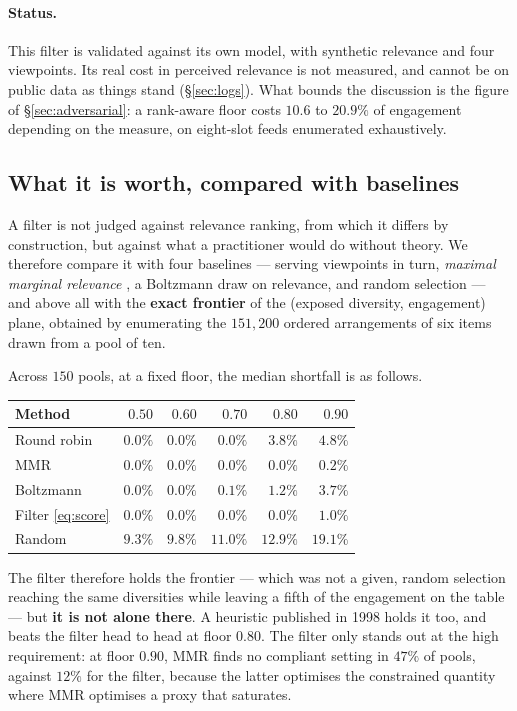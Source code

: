 \documentclass[11pt,a4paper]{article}
\begin{document}
\paragraph{Status.} This filter is validated against its own model, with synthetic relevance and
four viewpoints. Its real cost in perceived relevance is not measured, and cannot be on public
data as things stand (\S\ref{sec:logs}). What bounds the discussion is the figure of
\S\ref{sec:adversarial}: a rank-aware floor costs $10.6$ to $20.9\%$ of engagement depending on
the measure, on eight-slot feeds enumerated exhaustively.

\subsection{What it is worth, compared with baselines}
\label{sec:baselines}

A filter is not judged against relevance ranking, from which it differs by construction, but
against what a practitioner would do without theory. We therefore compare it with four baselines
--- serving viewpoints in turn, \emph{maximal marginal relevance} \citep{carbonell1998}, a
Boltzmann draw on relevance, and random selection --- and above all with the \textbf{exact
frontier} of the (exposed diversity, engagement) plane, obtained by enumerating the $151{,}200$
ordered arrangements of six items drawn from a pool of ten.

Across $150$ pools, at a fixed floor, the median shortfall is as follows.

\begin{center}
\begin{tabular}{@{}lrrrrr@{}}
\toprule
\textbf{Method} & $0.50$ & $0.60$ & $0.70$ & $0.80$ & $0.90$ \\
\midrule
Round robin & $0.0\%$ & $0.0\%$ & $0.0\%$ & $3.8\%$ & $4.8\%$ \\
MMR & $0.0\%$ & $0.0\%$ & $0.0\%$ & $\mathbf{0.0\%}$ & $\mathbf{0.2\%}$ \\
Boltzmann & $0.0\%$ & $0.0\%$ & $0.1\%$ & $1.2\%$ & $3.7\%$ \\
Filter \eqref{eq:score} & $0.0\%$ & $0.0\%$ & $0.0\%$ & $\mathbf{0.0\%}$ & $\mathbf{1.0\%}$ \\
Random & $9.3\%$ & $9.8\%$ & $11.0\%$ & $12.9\%$ & $19.1\%$ \\
\bottomrule
\end{tabular}
\end{center}

The filter therefore holds the frontier --- which was not a given, random selection reaching the
same diversities while leaving a fifth of the engagement on the table --- but \textbf{it is not
alone there}. A heuristic published in 1998 holds it too, and beats the filter head to head at
floor $0.80$. The filter only stands out at the high requirement: at floor $0.90$, MMR finds no
compliant setting in $47\%$ of pools, against $12\%$ for the filter, because the latter optimises
the constrained quantity where MMR optimises a proxy that saturates.
\end{document}
